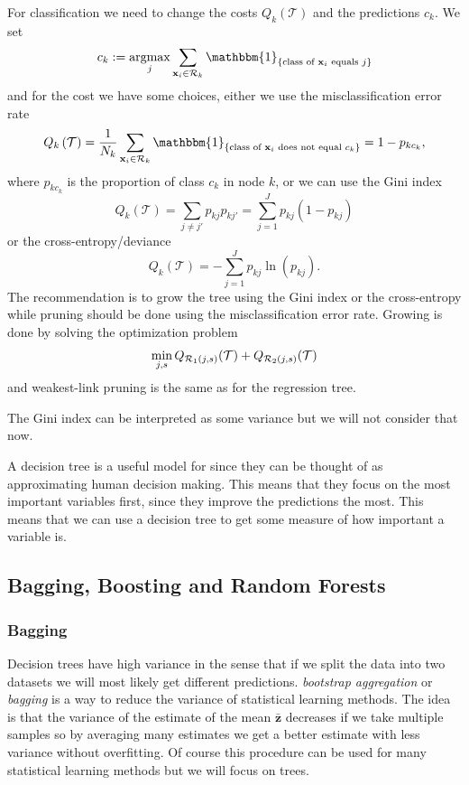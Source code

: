 \documentclass[a4paper, 12pt]{scrartcl}
\begin{document}
\begin{algorithm}
	For classification we need to change the costs $Q_k\left(\mathcal{T}\right)$ and the predictions $c_k$.
	We set
	\begin{equation*}
		c_k:=\operatornamewithlimits{argmax}_j \sum_{\mathbf{x}_i\in \mathcal{R}_k}\mathbbm{1}_{\{\text{class of }\mathbf{x}_i\text{ equals }j \}}
	\end{equation*}
	and for the cost we have some choices, either we use the misclassification error rate
	\begin{equation*}
		Q_k\left(\mathcal{T}\right)=\frac{1}{N_k}\sum_{\mathbf{x}_i\in \mathcal{R}_k}\mathbbm{1}_{\{\text{class of }\mathbf{x}_i\text{ does not equal }c_k \}}=1-p_{kc_k},
	\end{equation*}
	where $p_{kc_k}$ is the proportion of class $c_k$ in node $k$, or we can use the Gini index
	\begin{equation*}
		Q_k\left(\mathcal{T}\right)=\sum_{j\neq j'}p_{kj}p_{kj'}=\sum_{j=1}^{J}p_{kj}\left(1-p_{kj}\right)
	\end{equation*}
	or the cross-entropy/deviance
	\begin{equation*}
		Q_k\left(\mathcal{T}\right)=-\sum_{j=1}^{J}p_{kj}\ln\left(p_{kj}\right).
	\end{equation*}
	The recommendation is to grow the tree using the Gini index or the cross-entropy while pruning should be done using the misclassification error rate.
	Growing is done by solving the optimization problem
	\begin{equation*}
	\operatornamewithlimits{min}_{j,s} Q_{\mathcal{R}_1\left(j,s\right)}(\mathcal{T}) + Q_{\mathcal{R}_2\left(j,s\right)}(\mathcal{T})
	\end{equation*}
	and weakest-link pruning is the same as for the regression tree.
\end{algorithm}
The Gini index can be interpreted as some variance but we will not consider that now.

A decision tree is a useful model for since they can be thought of as approximating human decision making.
This means that they focus on the most important variables first, since they improve the predictions the most.
This means that we can use a decision tree to get some measure of how important a variable is.

\subsection{Bagging, Boosting and Random Forests}
\subsubsection*{Bagging}
Decision trees have high variance in the sense that if we split the data into two datasets we will most likely get different predictions.
\emph{bootstrap aggregation} or \emph{bagging} is a way to reduce the variance of statistical learning methods.
The idea is that the variance of the estimate of the mean $\bar{\mathbf{z}}$ decreases if we take multiple samples so by averaging many estimates we get a better estimate with less variance without overfitting.
Of course this procedure can be used for many statistical learning methods but we will focus on trees.
\end{document}

